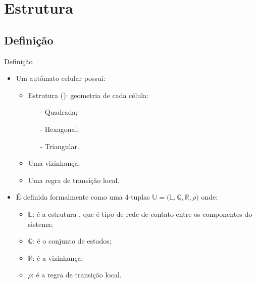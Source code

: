 \documentclass[compress, hide notes]{beamer}
\begin{document}
\section{Estrutura}
\subsection{Definição}

\begin{frame}{Definição \cite{ufmg}}
	
	\begin{itemize}
 		\setlength\itemsep{12pt}
	
		\item Um autômato celular possui:
		
		\begin{itemize}
 			\setlength\itemsep{6pt}
		
			\item Estrutura (): geometria de cada célula:
            \begin{itemize}
 			\setlength\itemsep{1pt}
				\item[-] Quadrada;
                \item[-] Hexagonal;
                \item[-] Triangular.
			\end{itemize}
			
			\item Uma vizinhança;
			
			\item Uma regra de transição local. 
		
		\end{itemize}
		\pause
        \bigskip
	
		\item É definida formalmente como uma 4-tuplas $\mathbb{U = (L, Q, R}, \rho)$ onde:
		
		\begin{itemize}
 			\setlength\itemsep{6pt}
		
			\item $\mathbb{L}$: é a estrutura , que é  tipo de rede de contato entre os componentes do sistema;
			
			\item $\mathbb{Q}$: é o conjunto de estados;
						
			\item $\mathbb{R}$: é a vizinhança;
									
			\item $\rho$: é a regra de transição local.
		
		\end{itemize}
	\end{itemize}
\end{frame}
\end{document}
